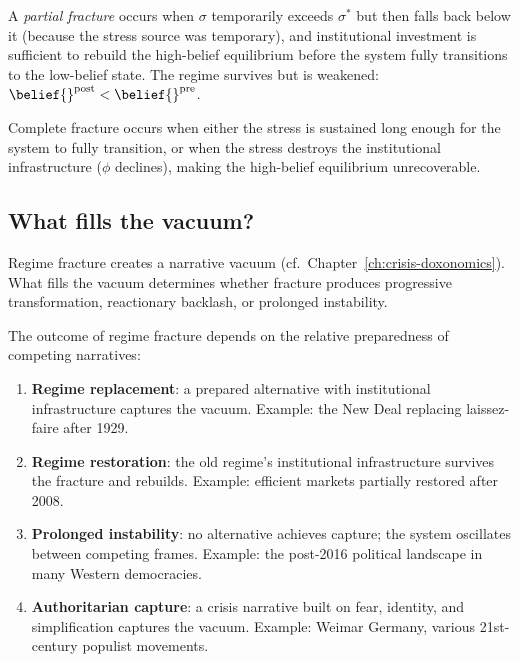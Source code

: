 \begin{definition}
\label{def:partial-fracture}
A \emph{partial fracture} occurs when $\sigma$ temporarily exceeds $\sigma^*$ but then falls back below it (because the stress source was temporary), and institutional investment is sufficient to rebuild the high-belief equilibrium before the system fully transitions to the low-belief state.
The regime survives but is weakened: $\belief{}^{\text{post}} < \belief{}^{\text{pre}}$.
\end{definition}

Complete fracture occurs when either the stress is sustained long enough for the system to fully transition, or when the stress destroys the institutional infrastructure ($\phi$ declines), making the high-belief equilibrium unrecoverable.

\subsection{What fills the vacuum?}

Regime fracture creates a narrative vacuum (cf.\ Chapter~\ref{ch:crisis-doxonomics}).
What fills the vacuum determines whether fracture produces progressive transformation, reactionary backlash, or prolonged instability.

\begin{proposition}
\label{prop:post-fracture}
The outcome of regime fracture depends on the relative preparedness of competing narratives:
\begin{enumerate}[nosep]
  \item \textbf{Regime replacement}: a prepared alternative with institutional infrastructure captures the vacuum. Example: the New Deal replacing laissez-faire after 1929.
  \item \textbf{Regime restoration}: the old regime's institutional infrastructure survives the fracture and rebuilds. Example: efficient markets partially restored after 2008.
  \item \textbf{Prolonged instability}: no alternative achieves capture; the system oscillates between competing frames. Example: the post-2016 political landscape in many Western democracies.
  \item \textbf{Authoritarian capture}: a crisis narrative built on fear, identity, and simplification captures the vacuum. Example: Weimar Germany, various 21st-century populist movements.
\end{enumerate}
\end{proposition}


